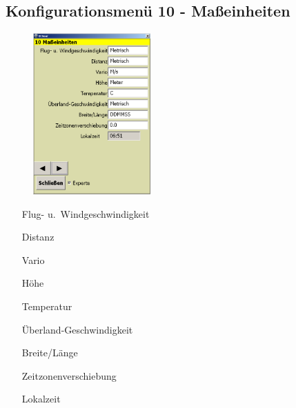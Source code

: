 \subsection{Konfigurationsmenü 10 - Maßeinheiten}\label{Konfig10}
\begin{figure}
\includegraphics[width=4.5cm]{Bilder/Konfig10Masseinheiten.png}
\end{figure}
\begin{enumerate}
\item[Flug- u.\ Windgeschwindigkeit]
\item[Distanz]
\item[Vario]
\item[Höhe]
\item[Temperatur]
\item[Überland-Geschwindigkeit]
\item[Breite/Länge]
\item[Zeitzonenverschiebung]
\item[Lokalzeit]
\end{enumerate}

